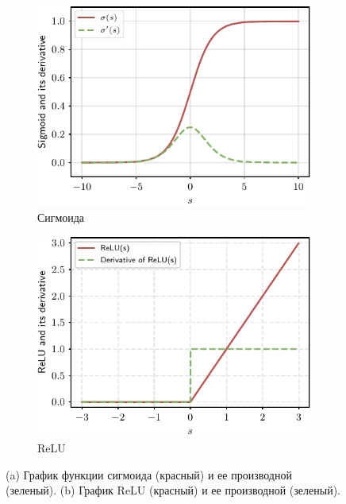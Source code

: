 \begin{figure}
    \centering
    \begin{subfigure}[b]{0.48\textwidth}
    \includegraphics[width=1.0\textwidth]{images/sigmoid_and_derivative}
    \caption{Сигмоида}
    \label{fig:sigmoid_and_derivative}
    \end{subfigure}
    \hfill
    \begin{subfigure}[b]{0.48\textwidth}
    \includegraphics[width=1.0\textwidth]{images/relu_and_derivative}
    \caption{ReLU}
    \label{fig:relu_and_derivative}
    \end{subfigure}
    \caption{(a) График функции сигмоида ({\color{drawred}красный}) и ее производной ({\color{drawgreen}зеленый}). (b) График ReLU ({\color{drawred}красный}) и ее производной ({\color{drawgreen}зеленый}).}
\end{figure}

